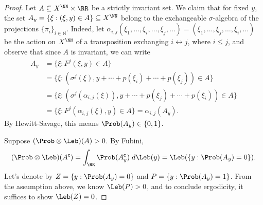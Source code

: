 \documentclass[b5paper]{article}
\begin{document}
\begin{proof}
  Let \(A \subseteq X^{\NN} \times \RR\) be a strictly invariant set. We claim that for fixed \(y\), the set \(A_{y} = \{ \xi : (\xi,y) \in A \} \subseteq X^{\NN}\) belong to the exchangeable \(\sigma\)-algebra of the projections \(\{ \pi_i \}_{i \in \mathbb{N}}\). Indeed, let \(\alpha_{i,j}(\xi_1,\dots,\xi_i,\dots,\xi_j,\dots) = (\xi_1,\dots,\xi_j,\dots,\xi_i,\dots)\) be the action on \(X^{\NN}\) of a transposition exchanging \(i \leftrightarrow j\), where \(i \leq j\), and observe that since \(A\) is invariant, we can write
  \begin{align*}
    A_{y} &= \{ \xi : F^j(\xi,y) \in A \}\\
            &= \{ \xi : (\sigma^j(\xi), y + \cdots + p(\xi_i) + \cdots + p(\xi_j)) \in A \}\\
            &= \{ \xi : (\sigma^j(\alpha_{i,j}(\xi)), y + \cdots + p(\xi_j) + \cdots + p(\xi_i)) \in A \}\\
            &= \{ \xi : F^j(\alpha_{i,j}(\xi),y) \in A \} = \alpha_{i,j}(A_{y}).
  \end{align*}
  By Hewitt-Savage, this means \(\Prob(A_{y}) \in \{ 0,1 \}\).

  Suppose \((\Prob \otimes \Leb) (A) > 0\). By Fubini,
  \begin{equation*}
    (\Prob \otimes \Leb) (A^{\complement}) = \int_{\RR} \Prob(A_{y}^{\complement}) \;d\Leb(y)
    = \Leb(\{ y : \Prob(A_y) = 0 \}).
  \end{equation*}
  Let's denote by \(Z = \{ y : \Prob(A_{y}) = 0 \}\) and \(P = \{ y : \Prob(A_y) = 1 \}\). From the assumption above, we know \(\Leb(P) > 0\), and to conclude ergodicity, it suffices to show \(\Leb(Z) = 0\).



\end{proof}
\end{document}
